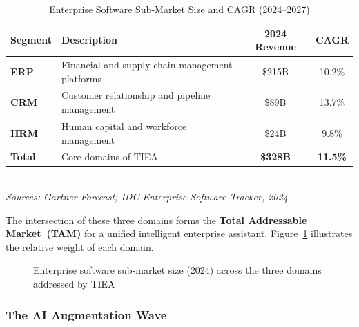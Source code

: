 \documentclass[12pt,a4paper]{report}
\begin{document}
\vspace{0.4em}
\begin{table}[H]
\centering
\caption{Enterprise Software Sub-Market Size and CAGR (2024--2027)}
\label{tab:market-size}
\renewcommand{\arraystretch}{1.45}
\begin{tabularx}{\linewidth}{>{\bfseries}l X c c}
\toprule
\rowcolor{talannavy}
\color{white}\textbf{Segment} &
\color{white}\textbf{Description} &
\color{white}\textbf{2024 Revenue} &
\color{white}\textbf{CAGR} \\
\midrule
\rowcolor{talangray}
ERP & Financial and supply chain management platforms & \$215B & 10.2\% \\
CRM & Customer relationship and pipeline management   & \$89B  & 13.7\% \\
\rowcolor{talangray}
HRM & Human capital and workforce management           & \$24B  &  9.8\% \\
\midrule
\textbf{Total} & Core domains of TIEA & \textbf{\$328B} & \textbf{11.5\%} \\
\bottomrule
\end{tabularx}\\[4pt]
{\footnotesize\itshape Sources: Gartner Forecast; IDC Enterprise Software Tracker, 2024}
\end{table}

The intersection of these three domains forms the \textbf{Total Addressable Market~(TAM)} for a
unified intelligent enterprise assistant.
Figure~\ref{fig:market-bar} illustrates the relative weight of each domain.

\begin{figure}[H]
\centering
{}
\caption{Enterprise software sub-market size (2024) across the three domains addressed by TIEA}
\label{fig:market-bar}
\end{figure}

\subsubsection{The AI Augmentation Wave}
\end{document}
